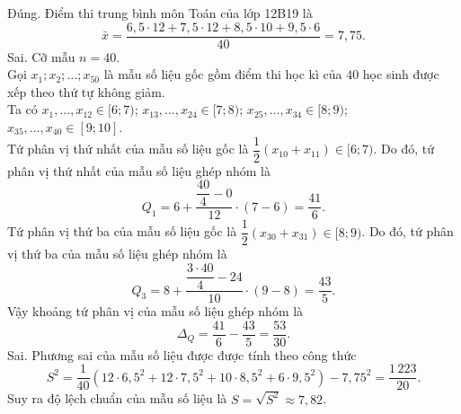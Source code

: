 \begin{ex}
{\begin{itemchoice}
			\itemch Đúng. Điểm thi trung bình môn Toán của lớp 12B19 là
			$$\bar{x}=\dfrac{6{,}5\cdot12+7{,}5\cdot12+8{,}5\cdot10+9{,}5\cdot6}{40}=7{,}75.$$
			\itemch Sai.
			Cỡ mẫu $n=40$.\\
			Gọi $x_1 ; x_2 ; \ldots ; x_{50}$ là mẫu số liệu gốc gồm điểm thi học kì của $40$ học sinh được xếp theo thứ tự không giảm.\\
			Ta có $x_1,\ldots, x_{12} \in[6;7)$; $x_{13}, \ldots, x_{24} \in[7;8)$; $x_{25}, \ldots, x_{34} \in[8;9)$; $x_{35}, \ldots, x_{40} \in[9;10]$.\\
			Tứ phân vị thứ nhất của mẫu số liệu gốc là $\dfrac{1}{2}\left(x_{10}+x_{11}\right) \in[6;7)$. Do đó, tứ phân vị thứ nhất của mẫu số liệu ghép nhóm là
			$$
			Q_1=6+\dfrac{\dfrac{40}{4}-0}{12} \cdot(7-6)=\dfrac{41}{6}.
			$$			
			Tứ phân vị thứ ba của mẫu số liệu gốc là $\dfrac{1}{2}\left(x_{30}+x_{31}\right) \in[8;9)$. Do đó, tứ phân vị thứ ba của mẫu số liệu ghép nhóm là
			$$
			Q_3=8+\dfrac{\dfrac{3\cdot40}{4}-24}{10} \cdot(9-8)=\dfrac{43}{5}.
			$$			
			Vậy khoảng tứ phân vị của mẫu số liệu ghép nhóm là
			$$
			\Delta_Q=\dfrac{41}{6}-\dfrac{43}{5}=\dfrac{53}{30}.
			$$
			\itemch Sai. Phương sai của mẫu số liệu được được tính theo công thức
			$$S^2=\dfrac{1}{40}\left(12\cdot6{,}5^2+12\cdot7{,}5^2+10\cdot8{,}5^2+6\cdot9{,}5^2\right)-7{,}75^2=\dfrac{1\,223}{20}.$$
			Suy ra độ lệch chuẩn của mẫu số liệu là $S=\sqrt{S^2}\approx 7{,}82$.
		\end{itemchoice}
	}
\end{ex}

